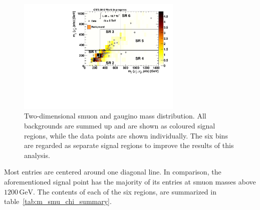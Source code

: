 \begin{figure}[!htb]
  \centering
  \includegraphics[width=0.7\textwidth]{plots/m_smu_chi.pdf}
  \caption{Two-dimensional smuon and gaugino mass distribution. All backgrounds are summed up and are shown as coloured signal regions, while the data points are shown individually. The six bins are regarded as separate signal regions to improve the results of this analysis.}
  \label{fig:m_smu_chi}
\end{figure}

\noindent Most entries are centered around one diagonal line. In comparison, the aforementioned signal point has the majority of its entries at smuon masses above $1200\,\text{GeV}$. The contents of each of the six regions, are summarized in table~\ref{tab:m_smu_chi_summary}.

